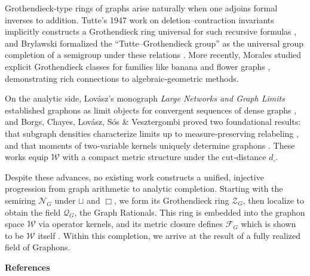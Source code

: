 \documentclass[11pt]{article}
\theoremstyle{definition}
\theoremstyle{plain}
\theoremstyle{remark}
\begin{document}
Grothendieck‑type rings of graphs arise naturally when one adjoins formal inverses to addition.  Tutte’s 1947 work on deletion–contraction invariants implicitly constructs a Grothendieck ring universal for such recursive formulas \cite{TutteGrothendieckInvariant}, and Brylawski formalized the “Tutte–Grothendieck group” as the universal group completion of a semigroup under these relations \cite{Poinsot2011}.  More recently, Morales studied explicit Grothendieck classes for families like banana and flower graphs \cite{Morales2025}, demonstrating rich connections to algebraic‑geometric methods.

On the analytic side, Lovász’s monograph \emph{Large Networks and Graph Limits} established graphons as limit objects for convergent sequences of dense graphs \cite{Lovasz2012}, and Borgs, Chayes, Lovász, Sós \& Vesztergombi proved two foundational results: that subgraph densities characterize limits up to measure‑preserving relabeling \cite{BorgsChayesLovaszSosVesztergombi2008}, and that moments of two‑variable kernels uniquely determine graphons \cite{BorgsChayesLovasz2010}.  These works equip \(\mathcal{W}\) with a compact metric structure under the cut‑distance \(d_{\square}\).

Despite these advances, no existing work constructs a unified, injective progression from graph arithmetic to analytic completion. Starting with the semiring \(\mathcal{N}_G\) under \(\sqcup\) and \(\Box\), we form its Grothendieck ring \(\mathcal{Z}_G\), then localize to obtain the field \(\mathcal{Q}_G\), the Graph Rationals. This ring is embedded into the graphon space \(\mathcal{W}\) via operator kernels, and its metric closure defines \(\mathcal{F}_G\) which is shown to be \(\mathcal{W}\) itself . Within this completion, we arrive at the result of a fully realized field of Graphons. 

\vspace{1ex}
\noindent\textbf{References}
\end{document}
